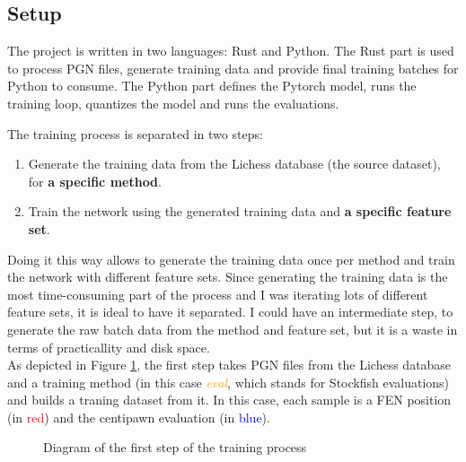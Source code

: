 \subsection{Setup}



The project is written in two languages: Rust and Python. The Rust part is used to process PGN files, generate training data and provide final training batches for Python to consume. The Python part defines the Pytorch model, runs the training loop, quantizes the model and runs the evaluations.

The training process is separated in two steps:

\begin{enumerate}
\item Generate the training data from the Lichess database (the source dataset), for \textbf{a specific method}.
\item Train the network using the generated training data and \textbf{a specific feature set}.
\end{enumerate}

Doing it this way allows to generate the training data once per method and train the network with different feature sets. Since generating the training data is the most time-consuming part of the process and I was iterating lots of different feature sets, it is ideal to have it separated. I could have an intermediate step, to generate the raw batch data from the method and feature set, but it is a waste in terms of practicallity and disk space. \\

As depicted in Figure \ref{fig:database_to_train_data}, the first step takes PGN files from the Lichess database and a training method (in this case \textcolor{orange}{\textit{eval}}, which stands for Stockfish evaluations) and builds a traning dataset from it. In this case, each sample is a FEN position (in \textcolor{red}{red}) and the centipawn evaluation (in \textcolor{blue}{blue}). \\

\begin{figure}[h]
\centering
{}
\caption{Diagram of the first step of the training process}
\label{fig:database_to_train_data}
\end{figure}


